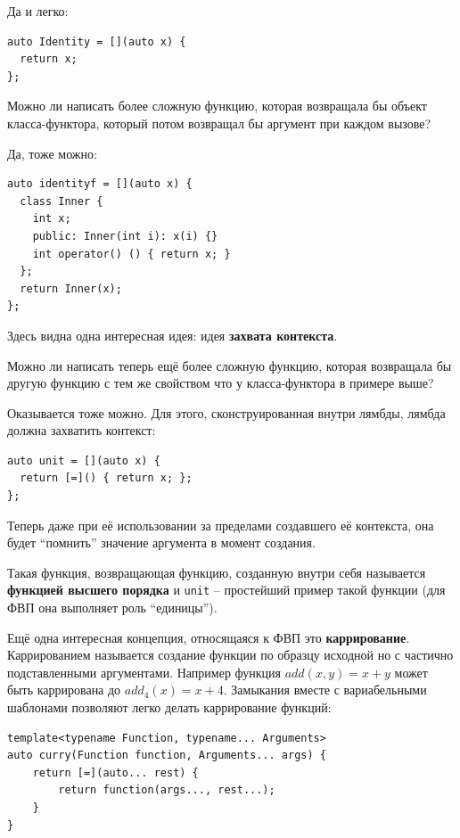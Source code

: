 \documentclass[a4paper,12pt,oneside]{book}
\begin{document}
Да и легко:

\begin{lstlisting}
auto Identity = [](auto x) {
  return x;
};
\end{lstlisting}

Можно ли написать более сложную функцию, которая возвращала бы объект класса-функтора, который потом возвращал бы аргумент при каждом вызове? 

Да, тоже можно:

\begin{lstlisting}
auto identityf = [](auto x) {
  class Inner {
    int x;
    public: Inner(int i): x(i) {}
    int operator() () { return x; }
  };
  return Inner(x);
};
\end{lstlisting}

Здесь видна одна интересная идея: идея \textbf{захвата контекста}. 

Можно ли написать теперь ещё более сложную функцию, которая возвращала бы другую функцию с тем же свойством что у класса-функтора в примере выше? 

Оказывается тоже можно. Для этого, сконструированная внутри лямбды, лямбда должна захватить контекст:

\begin{lstlisting}
auto unit = [](auto x) {
  return [=]() { return x; };
};
\end{lstlisting}

Теперь даже при её использовании за пределами создавшего её контекста, она будет ``помнить'' значение аргумента в момент создания.

Такая функция, возвращающая функцию, созданную внутри себя называется \textbf{функцией высшего порядка} и \lstinline!unit! -- простейший пример такой функции (для ФВП она выполняет роль ``единицы'').

Ещё одна интересная концепция, относящаяся к ФВП это \textbf{каррирование}. Каррированием называется создание функции по образцу исходной но с частично подставленными аргументами. Например функция $add(x,y) = x + y$ может быть каррирована до $add_4(x) = x + 4$. Замыкания вместе с вариабельными шаблонами позволяют легко делать каррирование функций:

\begin{lstlisting}
template<typename Function, typename... Arguments>
auto curry(Function function, Arguments... args) {
    return [=](auto... rest) {
        return function(args..., rest...);
    }
}
\end{lstlisting}
\end{document}
